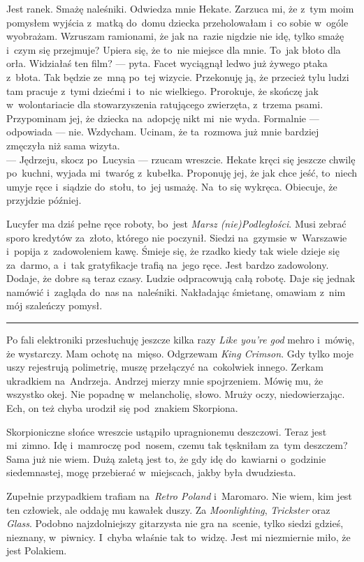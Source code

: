 \documentclass[9pt, a5paper]{memoir}
\begin{document}
Jest ranek. Smażę naleśniki. Odwiedza mnie Hekate. Zarzuca mi, że z~tym moim pomysłem wyjścia z~matką do~domu dziecka przeholowałam i~co sobie w~ogóle wyobrażam. Wzruszam ramionami, że jak na~razie nigdzie nie idę, tylko smażę i~czym się przejmuje? Upiera się, że to~nie miejsce dla mnie. To~jak błoto dla orła. Widziałaś ten film? --- pyta. Facet wyciągnął ledwo już żywego ptaka z~błota. Tak będzie ze~mną po~tej wizycie. Przekonuję ją, że przecież tylu ludzi tam pracuje z~tymi dziećmi i~to~nic wielkiego. Prorokuje, że skończę jak w~wolontariacie dla stowarzyszenia ratującego zwierzęta, z~trzema psami. Przypominam jej, że dziecka na~adopcję nikt mi~nie wyda. Formalnie --- odpowiada --- nie. Wzdycham. Ucinam, że ta~rozmowa już mnie bardziej zmęczyła niż sama wizyta.\\
--- Jędrzeju, skocz po~Lucysia --- rzucam wreszcie. Hekate kręci się jeszcze chwilę po~kuchni, wyjada mi~twaróg z~kubełka. Proponuję jej, że jak chce jeść, to~niech umyje ręce i~siądzie do~stołu, to~jej usmażę. Na~to się wykręca. Obiecuje, że przyjdzie później.

Lucyfer ma dziś pełne ręce roboty, bo~jest \textit{Marsz (nie)Podległości}. Musi zebrać sporo kredytów za~złoto, którego nie poczynił. Siedzi na~gzymsie w~Warszawie i~popija z~zadowoleniem kawę. Śmieje się, że rzadko kiedy tak wiele dzieje się za~darmo, a~i~tak gratyfikacje trafią na~jego ręce. Jest bardzo zadowolony. Dodaje, że dobre są teraz czasy. Ludzie odpracowują całą robotę. Daje się jednak namówić i~zagląda do~nas na~naleśniki. Nakładając śmietanę, omawiam z~nim mój szaleńczy pomysł.

\fancybreak{* \quad * \quad *}

Po fali elektroniki przesłuchuję jeszcze kilka razy \textit{Like you're god} mehro i~mówię, że wystarczy. Mam ochotę na~mięso. Odgrzewam \textit{King Crimson}. Gdy tylko moje uszy rejestrują polimetrię, muszę przełączyć na~cokolwiek innego. Zerkam ukradkiem na~Andrzeja. Andrzej mierzy mnie spojrzeniem. Mówię mu, że wszystko okej. Nie popadnę w~melancholię, słowo. Mruży oczy, niedowierzając. Ech, on też chyba urodził się pod~znakiem Skorpiona.

Skorpioniczne słońce wreszcie ustąpiło upragnionemu deszczowi. Teraz jest mi~zimno. Idę i~mamroczę pod~nosem, czemu tak tęskniłam za~tym deszczem? Sama już nie wiem. Dużą zaletą jest to, że gdy idę do~kawiarni o~godzinie siedemnastej, mogę przebierać w~miejscach, jakby była dwudziesta.

Zupełnie przypadkiem trafiam na~\textit{Retro Poland} i~Maromaro. Nie wiem, kim jest ten człowiek, ale oddaję mu kawałek duszy. Za \textit{Moonlighting}, \textit{Trickster} oraz \textit{Glass}. Podobno najzdolniejszy gitarzysta nie gra na~scenie, tylko siedzi gdzieś, nieznany, w~piwnicy. I~chyba właśnie tak to~widzę. Jest mi niezmiernie miło, że jest Polakiem.
\end{document}
